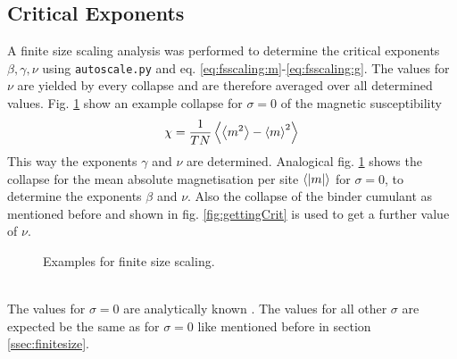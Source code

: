 \subsection{Critical Exponents}
    A finite size scaling analysis was
    performed to determine the critical exponents \(\beta, \gamma, \nu\)
    using \texttt{autoscale.py} \cite{autoscale2009} and eq. \eqref{eq:fsscaling:m}-\eqref{eq:fsscaling:g}.
    The values for \(\nu\) are yielded by every collapse and are therefore
    averaged over all determined values. Fig. \ref{fig:gettingCrit2}
    show an example collapse for \(\sigma=0\) of the magnetic susceptibility
    \[\chi = \frac{1}{TN}\left< \left< m^2 \right> - \left< m \right>^2 \right>\]
    This way the exponents \(\gamma\) and \(\nu\) are determined.
    Analogical fig. \ref{fig:gettingCrit2}
    shows the collapse for the mean absolute magnetisation per site \(\left< \left\vert m\right\vert \right>\) for \(\sigma=0\),
    to determine the exponents \(\beta\) and \(\nu\).
    Also the collapse of the binder cumulant as mentioned before and shown
    in fig. \ref{fig:gettingCrit}
    is used to get a further value of \(\nu\).
    \begin{figure}[htbp]
        \centering
        \caption[Examples of determining critical temperature and exponents]
        {
            Examples for finite size scaling.
        }
        \label{fig:gettingCrit2}
    \end{figure}\\
    The values for
    \(\sigma = 0\) are analytically known \cite{Pelissetto2002}. The
    values for all other \(\sigma\) are expected be the same as for
    \(\sigma = 0\) like mentioned before in section \ref{ssec:finitesize}.
